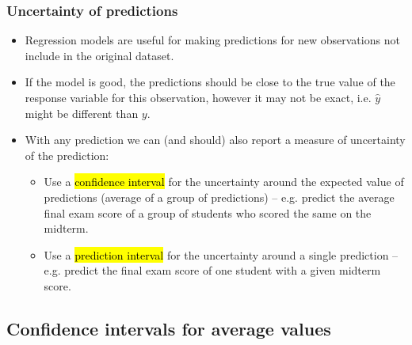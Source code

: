 \documentclass[slidestop,compress,mathserif,12pt,t,professionalfonts,xcolor=table]{beamer}
\begin{document}
\begin{frame}
\frametitle{Uncertainty of predictions}

\begin{itemize}

\item Regression models are useful for making predictions for new observations not include in the original dataset.

\pause

\item If the model is good, the predictions should be close to the true value of the response variable for this observation, however it may not be exact, i.e. $\hat{y}$ might be different than $y$.

\pause

\item With any prediction we can (and should) also report a measure of uncertainty of the prediction:
\begin{itemize}
\item Use a \hl{confidence interval} for the uncertainty around the expected value of predictions (average of a group of predictions) -- e.g. predict the average final exam score of a group of students who scored the same on the midterm.
\item Use a \hl{prediction interval} for the uncertainty around a single prediction -- e.g. predict the final exam score of one student with a given midterm score.
\end{itemize}

\end{itemize}

\end{frame}


\subsection{Confidence intervals for average values}


\begin{frame}
\frametitle{}


\end{frame}
\end{document}
